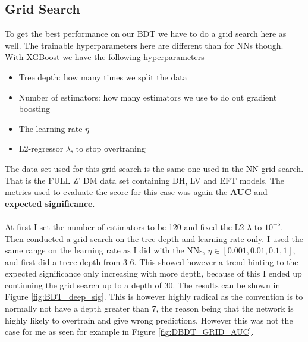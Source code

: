 \documentclass[14pt, a4paper]{book}
\begin{document}
\subsection{Grid Search}\label{sec:BDTGriddy}
To get the best performance on our BDT we have to do a grid search here as well. The trainable hyperparameters here are different than for NNs though. 
With XGBoost we have the following hyperparameters
\begin{itemize}
   \item Tree depth: how many times we split the data
   \item Number of estimators: how many estimators we use to do out gradient boosting 
   \item The learning rate $\eta$
   \item L2-regressor $\lambda$, to stop overtraning
\end{itemize}
The data set used for this grid search is the same one used in the NN grid search. That is the FULL Z' DM data set containing DH, LV and EFT models. 
The metrics used to evaluate the score for this case was again the \textbf{AUC} and \textbf{expected significance}.\\
\\At first I set the number of estimators to be 120 and fixed the L2 $\lambda$ to $10^{-5}$. Then conducted a grid search on the tree depth and learning rate only. 
I used the same range on the learning rate as I did with the NNs, $\eta \in [0.001, 0.01, 0.1, 1]$, and first did a treee depth from 3-6. 
This showed however a trend hinting to the expected significance only increasing with more depth, because of this I ended up continuing the grid search up to a depth of 30.
The results can be shown in Figure \ref{fig:BDT_deep_sig}. This is however highly radical as the convention is to normally not have a depth greater than 7, 
the reason being that the network is highly likely to overtrain and give wrong predictions. However this was not the case for me as seen for example in Figure \ref{fig:DBDT_GRID_AUC}.
\graphicspath{{../../../Plots/XGBoost/FULL/GRIDSEARCH_3-6}}
\end{document}
